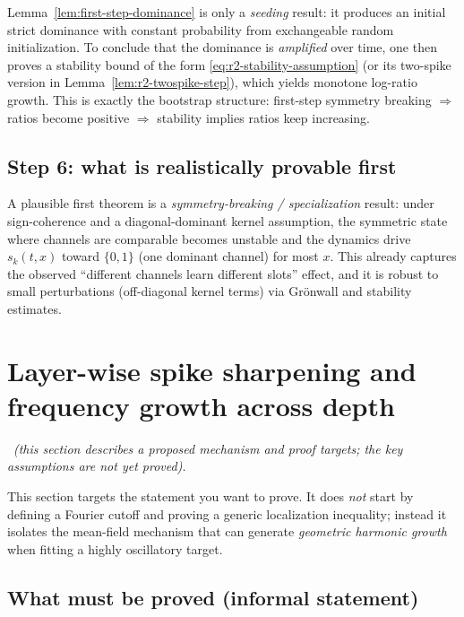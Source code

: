 \begin{remark}
Lemma~\ref{lem:first-step-dominance} is only a \emph{seeding} result: it produces an initial strict dominance with constant probability from exchangeable random initialization.
To conclude that the dominance is \emph{amplified} over time, one then proves a stability bound of the form \eqref{eq:r2-stability-assumption} (or its two-spike version in Lemma~\ref{lem:r2-twospike-step}), which yields monotone log-ratio growth.
This is exactly the bootstrap structure: first-step symmetry breaking $\Rightarrow$ ratios become positive $\Rightarrow$ stability implies ratios keep increasing.
\end{remark}

\subsection{Step 6: what is realistically provable first}

A plausible first theorem is a \emph{symmetry-breaking / specialization} result:
under sign-coherence and a diagonal-dominant kernel assumption, the symmetric state where channels are comparable becomes unstable and the dynamics drive $s_k(t,x)$ toward $\{0,1\}$ (one dominant channel) for most $x$.
This already captures the observed ``different channels learn different slots'' effect, and it is robust to small perturbations (off-diagonal kernel terms) via Gr\"onwall and stability estimates.

\section{Layer-wise spike sharpening and frequency growth across depth}
\label{sec:layers-frequency}
\openflag\ \textit{(this section describes a proposed mechanism and proof targets; the key assumptions are not yet proved).}

This section targets the statement you want to prove.
It does \emph{not} start by defining a Fourier cutoff and proving a generic localization inequality; instead it isolates the mean-field mechanism that can generate \emph{geometric harmonic growth} when fitting a highly oscillatory target.

\subsection{What must be proved (informal statement)}

